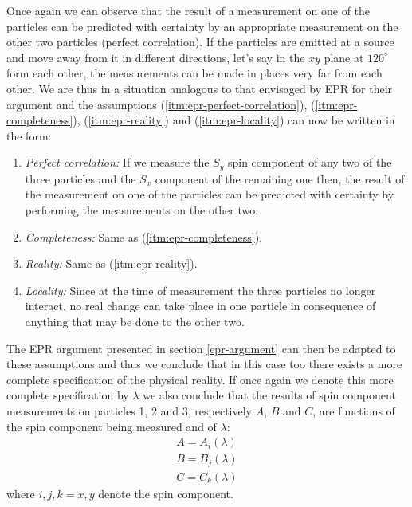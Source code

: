 Once again we can observe that the result of a measurement on one of the particles can be predicted with certainty by an appropriate measurement on the other two particles (perfect correlation). If the particles are emitted at a source and move away from it in different directions, let's say in the $xy$ plane at $120^{\circ}$ form each other, the measurements can be made in places very far from each other. We are thus in a situation analogous to that envisaged by EPR for their argument and the assumptions (\ref{itm:epr-perfect-correlation}), (\ref{itm:epr-completeness}), (\ref{itm:epr-reality}) and (\ref{itm:epr-locality}) can now be written in the form:%

\begin{enumerate}[label=(\alph*$'$)]
\item \label{itm:epr-perfect-correlation'} \textit{Perfect correlation:} If we measure the $S_y$ spin component of any two of the three particles and the $S_x$ component of the remaining one then, the result of the measurement on one of the particles can be predicted with certainty by performing the measurements on the other two.
\item \label{itm:epr-completeness'} \textit{Completeness:} Same as (\ref{itm:epr-completeness}).
\item \label{itm:epr-reality'} \textit{Reality:} Same as (\ref{itm:epr-reality}).
\item \label{itm:epr-locality'} \textit{Locality:} Since at the time of measurement the three particles no longer interact, no real change can take place in one particle in consequence of anything that may be done to the other two.
\end{enumerate}
The EPR argument presented in section \ref{epr-argument} can then be adapted to these assumptions and thus we conclude that in this case too there exists a more complete specification of the physical reality. If once again we denote this more complete specification by $\lambda$ we also conclude that the results of spin component measurements on particles 1, 2 and 3, respectively $A$, $B$ and $C$, are functions of the spin component being measured and of $\lambda$:%
\begin{equation}
  \label{eq:results-abc}
  \begin{split}
      A = A_i(\lambda)\\
      B = B_j(\lambda)\\
      C = C_k(\lambda)
  \end{split}
\end{equation}
where $i, j, k = x, y$ denote the spin component.%

